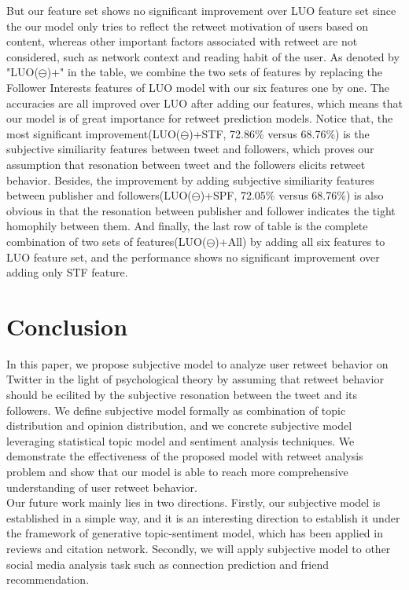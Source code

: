 \documentclass{acm_proc_article-sp}
\begin{document}
But our feature set shows no significant improvement over LUO feature set since the our model only tries to reflect the retweet motivation of users based on content, whereas other important factors associated with retweet are not considered, such as network context and reading habit of the user. 
As denoted by "LUO($ \ominus $)+" in the table, we combine the two sets of features by replacing the Follower Interests features of LUO model with our six features one by one. 
The accuracies are all improved over LUO after adding our features, which means that our model is of great importance for retweet prediction models. 
Notice that, the most significant improvement(LUO($ \ominus $)+STF, 72.86\% versus 68.76\%) is the subjective similiarity features between tweet and followers, which proves our assumption that resonation between tweet and the followers elicits retweet behavior.
Besides, the improvement by adding subjective similiarity features between publisher and followers(LUO($ \ominus $)+SPF, 72.05\% versus 68.76\%) is also obvious in that the resonation between publisher and follower indicates the tight homophily between them.
And finally, the last row of table is the complete combination of two sets of features(LUO($ \ominus $)+All) by adding all six features to LUO feature set, and the performance shows no significant improvement over adding only STF feature.
\section{Conclusion}
In this paper, we propose subjective model to analyze user retweet behavior on Twitter in the light of psychological theory by assuming that retweet behavior should be ecilited by the subjective resonation between the tweet and its followers. 
We define subjective model formally as combination of topic distribution and opinion distribution, and we concrete subjective model leveraging statistical topic model and sentiment analysis techniques.
We demonstrate the effectiveness of the proposed model with retweet analysis problem and show that our model is able to reach more comprehensive understanding of user retweet behavior. \\
Our future work mainly lies in two directions.
Firstly, our subjective model is established in a simple way, and it is an interesting direction to establish it under the framework of generative topic-sentiment model, which has been applied in reviews and citation network.
Secondly, we will apply subjective model to other social media analysis task such as connection prediction and friend recommendation.


\end{document}

